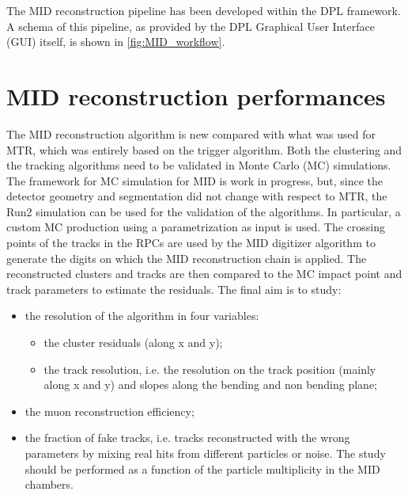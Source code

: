 The MID reconstruction pipeline has been developed within the DPL framework.
A schema of this pipeline, as provided by the DPL Graphical User Interface (GUI) itself, is shown in \ref{fig:MID_workflow}.

\section{MID reconstruction performances}
The MID reconstruction algorithm is new compared with what was used for MTR, which was entirely based on the trigger algorithm.
Both the clustering and the tracking algorithms need to be validated in Monte Carlo (MC) simulations. 
The framework for MC simulation for MID is work in progress, but, since the detector geometry and segmentation did not change with respect to MTR, the Run2 simulation can be used for the validation of the algorithms. 
In particular, a custom MC production using a \jpsi parametrization as input is used. 
The crossing points of the tracks in the RPCs are used by the MID digitizer algorithm to generate the digits on which the MID reconstruction chain is applied. 
The reconstructed clusters and tracks are then compared to the MC impact point and track parameters to estimate the residuals. 
The final aim is to study:
\begin{itemize}
    \item the resolution of the algorithm in four variables: 
    \begin{itemize}
        \item the cluster residuals (along x and y);
        \item the track resolution, i.e. the resolution on the track position (mainly along x and y) and slopes along the bending and non bending plane;
    \end{itemize}
    
    \item the muon reconstruction efficiency;
    \item the fraction of fake tracks, i.e. tracks reconstructed with the wrong parameters by mixing real hits from different particles or noise. The study should be performed as a function of the particle multiplicity in the MID chambers.
\end{itemize}

